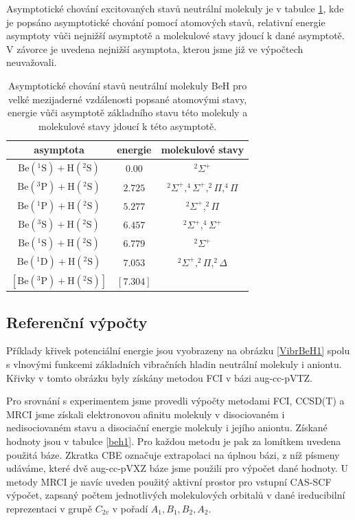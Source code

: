 Asymptotické chování excitovaných stavů neutrální molekuly je v tabulce \ref{taBeHas}, 
kde je popsáno asymptotické chování pomocí atomových stavů, relativní energie asymptoty 
vůči nejnižší asymptotě a molekulové stavy jdoucí k dané asymptotě. V závorce 
je uvedena nejnižší asymptota, kterou jsme již ve výpočtech neuvažovali.

\begin{table}
\centering
\caption{Asymptotické chování stavů neutrální molekuly BeH pro velké mezijaderné 
vzdálenosti popsané atomovými stavy, energie vůči asymptotě základního stavu této 
molekuly a molekulové stavy jdoucí k této asymptotě.}
\bigskip
\label{taBeHas}
\begin{tabular}{ccc}
\toprule
asymptota & energie & molekulové stavy \\ 
\midrule
$\mathrm{Be}(^1\mathrm{S}) + \mathrm{H}(^2\mathrm{S})$ & $0.00$ & $^2\Sigma^+$ \\ 
$\mathrm{Be}(^3\mathrm{P}) + \mathrm{H}(^2\mathrm{S})$ & $2.725$ & $^2\Sigma^+,^4\Sigma^+,^2\Pi,^4\Pi$ \\
$\mathrm{Be}(^1\mathrm{P}) + \mathrm{H}(^2\mathrm{S})$ & $5.277$ & $^2\Sigma^+,^2\Pi$ \\ 
$\mathrm{Be}(^3\mathrm{S}) + \mathrm{H}(^2\mathrm{S})$ & $6.457$ & $^2\Sigma^+,^4\Sigma^+$ \\
$\mathrm{Be}(^1\mathrm{S}) + \mathrm{H}(^2\mathrm{S})$ & $6.779$ & $^2\Sigma^+$ \\
$\mathrm{Be}(^1\mathrm{D}) + \mathrm{H}(^2\mathrm{S})$ & $7.053$ & $^2\Sigma^+,^2\Pi,^2\Delta$ \\
$\left[\mathrm{Be}(^3\mathrm{P}) + \mathrm{H}(^2\mathrm{S})\right]$ &$[7.304]$& \\
\bottomrule
\end{tabular}
\end{table}


\subsection{Referenční výpočty}
Příklady křivek potenciální energie jsou vyobrazeny na obrázku  
\ref{VibrBeH1} spolu s vlnovými funkcemi základních vibračních hladin neutrální 
molekuly i aniontu.
Křivky v tomto obrázku byly získány metodou FCI v bázi aug-cc-pVTZ.

Pro srovnání s experimentem jsme provedli výpočty metodami FCI, CCSD(T) a MRCI jsme  
získali elektronovou afinitu molekuly v disociovaném i nedisociovaném 
stavu a disociační energie molekuly i jejího aniontu. Získané hodnoty jsou v tabulce \ref{beh1}. Pro každou metodu je pak za lomítkem 
uvedena použitá báze. Zkratka CBE označuje extrapolaci na úplnou bázi, z níž písmeny udáváme, které dvě aug-cc-pVXZ báze jsme použili pro výpočet dané hodnoty. U metody MRCI je navíc uveden použitý aktivní prostor
pro vstupní CAS-SCF výpočet,
zapsaný počtem jednotlivých molekulových orbitalů v dané ireducibilní reprezentaci v 
grupě $C_{2v}$ v pořadí $A_1, B_1, B_2, A_2$. 

